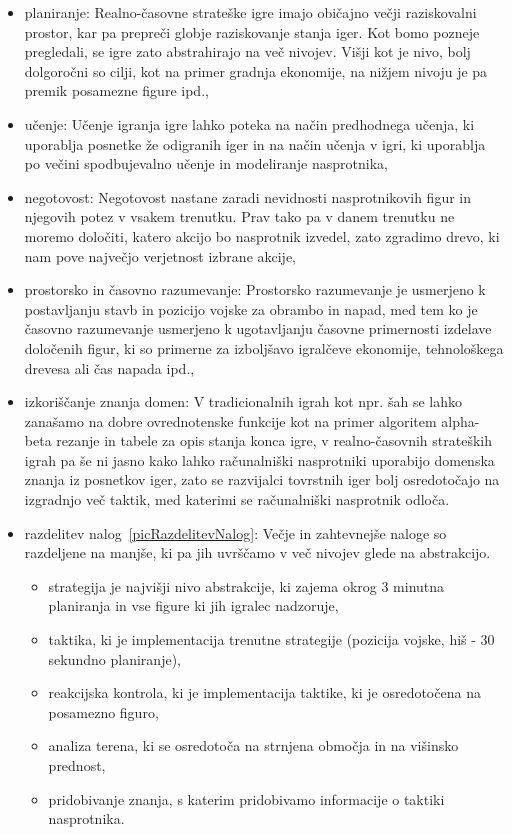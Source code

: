 \documentclass[a4paper, 12pt]{book}
\begin{document}
\begin{itemize}
	\item planiranje: Realno-časovne strateške igre imajo običajno večji raziskovalni prostor, kar pa prepreči globje raziskovanje stanja iger. Kot bomo pozneje pregledali, se igre zato abstrahirajo na več nivojev.
	Višji kot je nivo, bolj dolgoročni so cilji, kot na primer gradnja ekonomije, na nižjem nivoju je pa premik posamezne figure ipd.,
	\item učenje: Učenje igranja igre lahko poteka na način predhodnega učenja, ki uporablja posnetke že odigranih iger in na način učenja v igri, ki uporablja po večini spodbujevalno učenje in modeliranje nasprotnika,
	\item negotovost: Negotovost nastane zaradi nevidnosti nasprotnikovih figur in njegovih potez v vsakem trenutku. 
	Prav tako pa v danem trenutku ne moremo določiti, katero akcijo bo nasprotnik izvedel, zato zgradimo drevo, ki nam pove največjo verjetnost izbrane akcije,
	\item prostorsko in časovno razumevanje:
	Prostorsko razumevanje je usmerjeno k postavljanju stavb in pozicijo vojske za obrambo in napad, med tem ko je časovno razumevanje usmerjeno k ugotavljanju časovne primernosti izdelave določenih figur, ki so primerne za izboljšavo igralčeve ekonomije, tehnološkega drevesa ali čas napada ipd.,
	\item izkoriščanje znanja domen: V tradicionalnih igrah kot npr. šah se lahko zanašamo na dobre ovrednotenske funkcije kot na primer algoritem alpha-beta rezanje in tabele za opis stanja konca igre, v realno-časovnih strateških igrah pa še ni jasno kako lahko računalniški nasprotniki uporabijo domenska znanja iz posnetkov iger, zato se razvijalci tovrstnih iger bolj osredotočajo na izgradnjo več taktik, med katerimi se računalniški nasprotnik odloča.
	\item razdelitev nalog~\ref{picRazdelitevNalog}:
	Večje in zahtevnejše naloge so razdeljene na manjše, ki pa jih uvrščamo v več nivojev glede na abstrakcijo.
	\begin{itemize}
		\item strategija je najvišji nivo abstrakcije, ki zajema okrog 3 minutna planiranja in vse figure ki jih igralec nadzoruje, 
		\item taktika, ki je implementacija trenutne strategije (pozicija vojske, hiš - 30 sekundno planiranje),
		\item reakcijska kontrola, ki je implementacija taktike, ki je osredotočena na posamezno figuro,
		\item analiza terena, ki se osredotoča na strnjena območja in na višinsko prednost,
		\item pridobivanje znanja, s katerim pridobivamo informacije o taktiki nasprotnika.
	\end{itemize}


\end{itemize}
\end{document}
